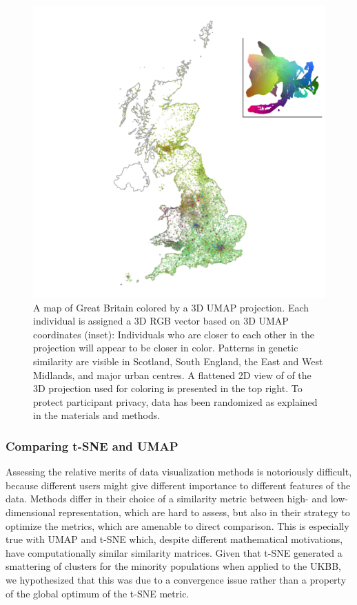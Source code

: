 \documentclass[12pt]{pnas-new}
\begin{document}
\begin{figure}
    \centering
    \includegraphics[width=0.5\columnwidth]{images/UKBB_mapsInMaps_2D3_permute50.jpg}
    \caption{A map of Great Britain colored by a 3D UMAP projection. Each individual is assigned a 3D RGB vector based on 3D UMAP coordinates (inset): Individuals who are closer to each other in the projection will appear to be closer in color. Patterns in genetic similarity are visible in Scotland, South England, the East and West Midlands, and major urban centres. A flattened 2D view of of the 3D projection used for coloring is presented in the top right. To protect participant privacy, data has been randomized as explained in the materials and methods.}
    \label{fig:umap_ukbb_geo_map}
\end{figure}

\subsubsection*{Comparing t-SNE and UMAP}
Assessing the relative merits of data visualization methods is notoriously difficult, because different users might give different importance to different features of the data. Methods differ in their choice of a similarity metric between high- and low-dimensional representation, which are hard to assess, 
 but also in their strategy to optimize the metrics, which are amenable to direct comparison. This is especially true with UMAP and t-SNE which, despite different mathematical motivations, have computationally similar similarity matrices. Given that t-SNE generated a smattering of clusters for the minority populations when applied to the UKBB, we hypothesized that this was due to a convergence issue rather than a property of the global optimum of the t-SNE metric.  
    
\end{document}

